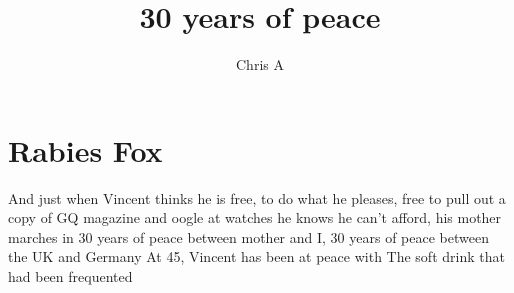 \documentclass[19pt,openany]{book}
\title{30 years of peace}
\author{Chris A}
\date{}
\begin{document}
\maketitle
\tableofcontents

\chapter{Rabies Fox}
And just when Vincent thinks he is free, to do what he pleases, free to pull out a copy of GQ magazine and oogle at watches he knows he can't afford, his mother marches in
30 years of peace between mother and I, 30 years of peace between the UK and Germany
At 45, Vincent has been at peace with
The soft drink that had been frequented
\end{document}
